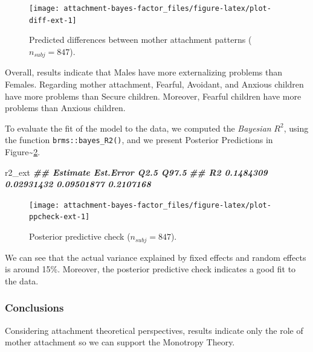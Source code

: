 \documentclass[
]{book}
\newenvironment{Shaded}{\begin{snugshade}}{\end{snugshade}}
\newcommand{\DocumentationTok}[1]{\textcolor[rgb]{0.56,0.35,0.01}{\textbf{\textit{#1}}}}
\newcommand{\NormalTok}[1]{#1}
\begin{document}
\begin{figure}

{\centering \texttt{[image: attachment-bayes-factor\_files/figure-latex/plot-diff-ext-1]} 

}

\caption{Predicted differences between mother attachment patterns ($n_{subj} = 847$).}\label{fig:plot-diff-ext}
\end{figure}

Overall, results indicate that Males have more externalizing problems than Females. Regarding mother attachment, Fearful, Avoidant, and Anxious children have more problems than Secure children. Moreover, Fearful children have more problems than Anxious children.

To evaluate the fit of the model to the data, we computed the \emph{Bayesian} \(R^2\), using the function \texttt{brms::bayes\_R2()}, and we present Posterior Predictions in Figure\textasciitilde\ref{fig:plot-ppcheck-ext}.

\begin{Shaded}
\begin{Highlighting}[]
\NormalTok{r2\_ext}
\DocumentationTok{\#\#     Estimate  Est.Error       Q2.5     Q97.5}
\DocumentationTok{\#\# R2 0.1484309 0.02931432 0.09501877 0.2107168}
\end{Highlighting}
\end{Shaded}

\begin{figure}

{\centering \texttt{[image: attachment-bayes-factor\_files/figure-latex/plot-ppcheck-ext-1]} 

}

\caption{Posterior predictive check ($n_{subj} = 847$).}\label{fig:plot-ppcheck-ext}
\end{figure}

We can see that the actual variance explained by fixed effects and random effects is around 15\%. Moreover, the posterior predictive check indicates a good fit to the data.

\hypertarget{conclusions-2}{%
\subsubsection*{Conclusions}\label{conclusions-2}}

Considering attachment theoretical perspectives, results indicate only the role of mother attachment so we can support the Monotropy Theory.
\end{document}
